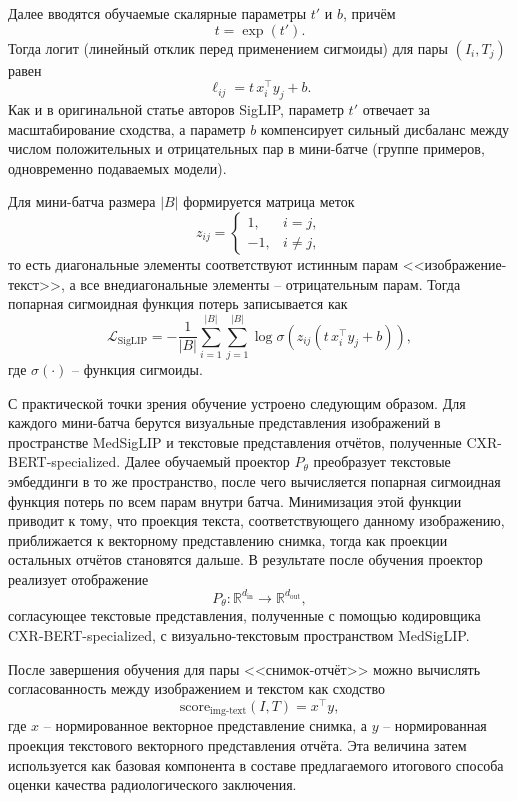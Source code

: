 Далее вводятся обучаемые скалярные параметры $t'$ и $b$, причём
\[
t = \exp(t').
\]
Тогда логит (линейный отклик перед применением сигмоиды) для пары $(I_i, T_j)$ равен
\[
\ell_{ij} = t\, x_i^\top y_j + b.
\]
Как и в оригинальной статье авторов SigLIP, параметр $t'$ отвечает за масштабирование сходства, а параметр $b$ компенсирует сильный дисбаланс между числом положительных и отрицательных пар в мини-батче (группе примеров, одновременно подаваемых модели).

Для мини-батча размера $|B|$ формируется матрица меток
\[
z_{ij} =
\begin{cases}
1, & i=j,\\
-1, & i\neq j,
\end{cases}
\]
то есть диагональные элементы соответствуют истинным парам <<изображение-текст>>, а все внедиагональные элементы -- отрицательным парам. Тогда попарная сигмоидная функция потерь записывается как
\[
\mathcal{L}_{\mathrm{SigLIP}}
=
-
\frac{1}{|B|}
\sum_{i=1}^{|B|}
\sum_{j=1}^{|B|}
\log \sigma\!\left(z_{ij}\left(t\,x_i^\top y_j + b\right)\right),
\]
где $\sigma(\cdot)$ -- функция сигмоиды.

С практической точки зрения обучение устроено следующим образом. Для каждого мини-батча берутся визуальные представления изображений в пространстве MedSigLIP и текстовые представления отчётов, полученные CXR-BERT-specialized. Далее обучаемый проектор $P_{\theta}$ преобразует текстовые эмбеддинги в то же пространство, после чего вычисляется попарная сигмоидная функция потерь по всем парам внутри батча. Минимизация этой функции приводит к тому, что проекция текста, соответствующего данному изображению, приближается к векторному представлению снимка, тогда как проекции остальных отчётов становятся дальше. В результате после обучения проектор реализует отображение
\[
P_{\theta} : \mathbb{R}^{d_{\mathrm{in}}} \to \mathbb{R}^{d_{\mathrm{out}}},
\]
согласующее текстовые представления, полученные с помощью кодировщика CXR-BERT-specialized, с визуально-текстовым пространством MedSigLIP.

После завершения обучения для пары <<снимок-отчёт>> можно вычислять согласованность между изображением и текстом как сходство
\[
\mathrm{score}_{\mathrm{img\text{-}text}}(I,T) = x^\top y,
\]
где $x$ -- нормированное векторное представление снимка, а $y$ -- нормированная проекция текстового векторного представления отчёта. Эта величина затем используется как базовая компонента в составе предлагаемого итогового способа оценки качества радиологического заключения.

